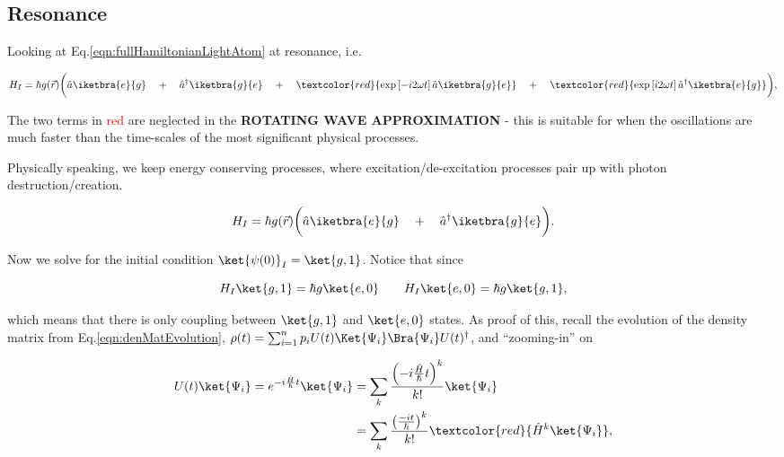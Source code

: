 \subsection{Resonance}

Looking at Eq.\eqref{eqn:fullHamiltonianLightAtom} at resonance, i.e. 

\begin{equation}
H_I = \hbar g(\vec{r}) \bigg(\hat{a}\iketbra{e}{g} \quad+\quad \hat{a}^\dagger\iketbra{g}{e} \quad+\quad \textcolor{red}{\exp\left[-i2\omega t\right]\hat{a}\iketbra{g}{e}} \quad+\quad \textcolor{red}{\exp\left[i2\omega t\right]\hat{a}^\dagger\iketbra{e}{g}}\bigg),
\end{equation}

\noindent The two terms in \textcolor{red}{red} are neglected in the \textbf{\large ROTATING WAVE APPROXIMATION} - this is suitable for when the oscillations are much faster than the time-scales of the most significant physical processes.

Physically speaking, we keep energy conserving processes, where excitation/de-excitation processes pair up with photon destruction/creation.

\begin{equation}
H_I = \hbar g(\vec{r}) \bigg(\hat{a}\iketbra{e}{g} \quad+\quad \hat{a}^\dagger\iketbra{g}{e} \bigg).
\label{eqn:rwa1}
\end{equation}
\vspace{6ex}

\noindent Now we solve for the initial condition $\ket{\psi(0)}_I = \ket{g,1}$. Notice that since

\begin{equation}
\label{eqn:effect}
H_I\ket{g,1} = \hbar g\ket{e,0} \qquad H_I\ket{e,0} = \hbar g\ket{g,1},
\end{equation}

\noindent which means that there is only coupling between $\ket{g,1}$ and $\ket{e,0}$ states. As proof of this, recall the evolution of the density matrix from Eq.\eqref{eqn:denMatEvolution}, $\rho(t) = \sum_{i=1}^{n} p_iU(t)\Ket{\Psi_i}\Bra{\Psi_i}U(t)^{\dagger}$, and ``zooming-in'' on

\begin{equation}
\label{eqn:resonance4}
\begin{aligned}
U(t)\ket{\Psi_i} = e^{-i\frac{\hat{H}}{\hbar}t}\ket{\Psi_i} & = \sum_k \frac{\left( -i\frac{\hat{H}}{\hbar}t\right)^k }{k!}\ket{\Psi_i}\\
& = \sum_k \frac{\left(\frac{-it}{\hbar}\right)^k }{k!}\textcolor{red}{\hat{H}^k\ket{\Psi_i}},
\end{aligned}
\end{equation}


